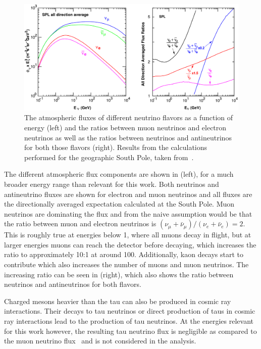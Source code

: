 \begin{figure}
    \centering
    \includegraphics[width=1.0\textwidth]{figures/neutrinos_properties/Honda_alldir-spl_copy.pdf}
    \caption[Atmospheric neutrino fluxes]{The atmospheric fluxes of different neutrino flavors as a function of energy (left) and the ratios between muon neutrinos and electron neutrinos as well as the ratios between neutrinos and antineutrinos for both those flavors (right). Results from the calculations performed for the geographic South Pole, taken from~\cite{PhysRevD.92.023004_Honda_Flux}.}
\end{figure}

The different atmospheric flux components are shown in  (left), for a much broader energy range than relevant for this work. Both neutrinos and antineutrino fluxes are shown for electron  and muon neutrinos and all fluxes are the directionally averaged expectation calculated at the South Pole. Muon neutrinos are dominating the flux and from  the naive assumption would be that the ratio between muon and electron neutrinos is $(\nu_\mu+\bar{\nu}_\mu)/(\nu_e+\bar{\nu}_e)=2$. This is roughly true at energies below \SI{1}{\gev}, where all muons decay in flight, but at larger energies muons can reach the detector before decaying, which increases the ratio to approximately 10:1 at around \SI{100}{\gev}. Additionally, kaon decays start to contribute which also increases the number of muons and muon neutrinos. The increasing ratio can be seen in  (right), which also shows the ratio between neutrinos and antineutrinos for both flavors.

Charged mesons heavier than the tau can also be produced in cosmic ray interactions. Their decays to tau neutrinos or direct production of taus in cosmic ray interactions lead to the production of tau neutrinos. At the energies relevant for this work however, the resulting tau neutrino flux is negligible as compared to the muon neutrino flux~ and is not considered in the analysis.


